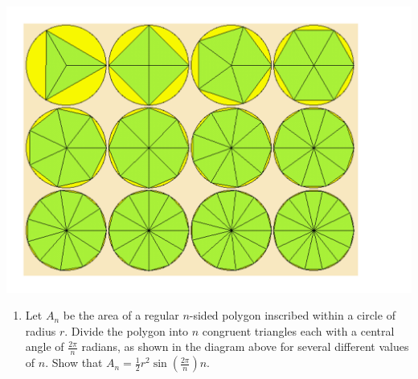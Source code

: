 \documentclass[12pt]{article}
\begin{document}
\begin{enumerate}
\begin{center}

\includegraphics[scale=0.4]{Inscribed.pdf}

\end{center}

\begin{enumerate}

\item Let $A_n$ be the area of a regular $n$-sided polygon inscribed within a circle of radius $r$.  Divide the polygon into $n$ congruent triangles each with a central angle of $\frac{2\pi}{n}$ radians, as shown in the diagram above for several different values of $n$.    Show that $A_n=\frac{1}{2}r^2 \sin{\left(\frac{2\pi}{n}\right)} n$.


\end{enumerate}
\end{enumerate}
\end{document}
